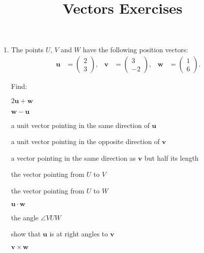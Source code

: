 \documentclass[a4paper,11pt]{article}
\title{Vectors Exercises}
\begin{document}
\maketitle

\begin{enumerate}[label=3.\arabic*]
    \item The points $U$, $V$ and $W$ have the following position vectors:
    \begin{align*}
        \mathbf{u} &= \begin{pmatrix} 2 \\ 3 \end{pmatrix}, &
        \mathbf{v} &= \begin{pmatrix} 3 \\ -2 \end{pmatrix}, &
        \mathbf{w} &= \begin{pmatrix} 1 \\ 6 \end{pmatrix}.
    \end{align*}

    Find:
    \begin{tasks}
        \task $2 \mathbf{u} + \mathbf{w}$

        \task $\mathbf{w} - \mathbf{u}$

        \task a unit vector pointing in the same direction of $\mathbf{u}$

        \task a unit vector pointing in the opposite direction of $\mathbf{v}$

        \task a vector pointing in the same direction as $\mathbf{v}$ but half its length 

        \task the vector pointing from $U$ to $V$

        \task the vector pointing from $U$ to $W$

        \task $\mathbf{u} \cdot \mathbf{w}$

        \task the angle $\angle VUW$

        \task show that $\mathbf{u}$ is at right angles to $\mathbf{v}$

        \task $\mathbf{v} \times \mathbf{w}$
    \end{tasks}


\end{enumerate}
\end{document}
